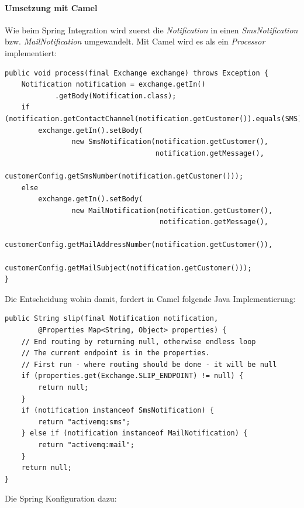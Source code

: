 \documentclass[12pt,a4paper,ngerman]{article}
\begin{document}
\paragraph{Umsetzung mit Camel}

Wie beim Spring Integration wird zuerst die \emph{Notification} in einen
\emph{SmsNotification} bzw. \emph{MailNotification} umgewandelt. Mit
Camel wird es als ein \emph{Processor} implementiert:

\begin{lstlisting}
public void process(final Exchange exchange) throws Exception {
    Notification notification = exchange.getIn()
            .getBody(Notification.class);
    if (notification.getContactChannel(notification.getCustomer()).equals(SMS))
        exchange.getIn().setBody(
                new SmsNotification(notification.getCustomer(),
                                    notification.getMessage(), 
                                    customerConfig.getSmsNumber(notification.getCustomer()));
    else
        exchange.getIn().setBody(
                new MailNotification(notification.getCustomer(),
                                     notification.getMessage(), 
                                     customerConfig.getMailAddressNumber(notification.getCustomer()),
                                     customerConfig.getMailSubject(notification.getCustomer()));
}
\end{lstlisting}

Die Entscheidung wohin damit, fordert in Camel folgende Java
Implementierung:

\begin{lstlisting}
public String slip(final Notification notification,
        @Properties Map<String, Object> properties) {
    // End routing by returning null, otherwise endless loop
    // The current endpoint is in the properties.
    // First run - where routing should be done - it will be null
    if (properties.get(Exchange.SLIP_ENDPOINT) != null) {
        return null;
    }
    if (notification instanceof SmsNotification) {
        return "activemq:sms";
    } else if (notification instanceof MailNotification) {
        return "activemq:mail";
    }
    return null;
}
\end{lstlisting}

Die Spring Konfiguration dazu:
\end{document}
